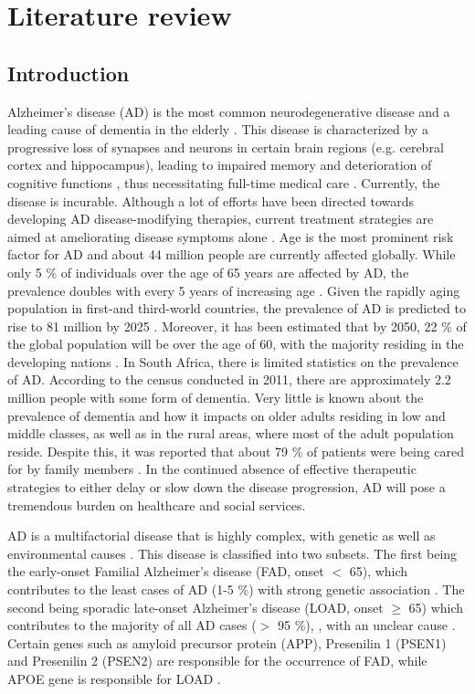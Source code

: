 \chapter{Literature review}
\section{Introduction}
Alzheimer’s disease (AD) is the most common neurodegenerative disease and a leading cause of dementia in the elderly \citep{andrieu2015}. This disease is characterized by a progressive loss of synapses and neurons in certain brain regions (e.g. cerebral cortex and hippocampus), leading to impaired memory and deterioration of cognitive functions \citep{dekosky1990,scheff2006,zare-shahabadi2015}, thus necessitating full-time medical care \citep{prince2013}. Currently, the disease is incurable. Although a lot of efforts have been directed towards developing AD disease-modifying therapies, current treatment strategies are aimed at ameliorating disease symptoms alone \citep{anand2014,disanto2013}. Age is the most prominent risk factor for AD and about 44 million people are currently affected globally. While only 5 \% of individuals over the age of 65 years are affected by AD, the prevalence doubles with every 5 years of increasing age \citep{pimenova2018,qiu2009}. Given the rapidly aging population in first-and third-world countries, the prevalence of AD is predicted to rise to 81 million by 2025 \citep{AlzheimersAssociation2014,Ferri2005}. Moreover, it has been estimated that by 2050, 22 \% of the global population will be over the age of 60, with the majority residing in the developing nations \citep{Annear2015,Paddick2013}. In South Africa, there is limited statistics on the prevalence of AD. According to the census conducted in 2011, there are approximately 2.2 million people with some form of dementia. Very little is known about the prevalence of dementia and how it impacts on older adults residing in low and middle classes, as well as in the rural areas, where most of the adult population reside. Despite this, it was reported that about 79 \% of patients were being cared for by family members \citep{Kalula2010}. In the continued absence of effective therapeutic strategies to either delay or slow down the disease progression, AD will pose a tremendous burden on healthcare and social services. 

AD is a multifactorial disease that is highly complex, with genetic as well as environmental causes \citep{Dorszewska2016}. This disease is classified into two subsets. The first being the early-onset Familial Alzheimer’s disease (FAD, onset $<$ 65), which contributes to the least cases of AD (1-5 \%) with strong genetic association \citep{Musiek2015,Reitz2014,Swerdlow2007}. The second being sporadic late-onset Alzheimer’s disease (LOAD, onset $\geq$ 65) which contributes to the majority of all AD cases ($>$ 95 \%), \citep{Musiek2015,Reitz2014,Swerdlow2007}, with an unclear cause \citep{Dorszewska2016,pimenova2018}. Certain genes such as amyloid precursor protein (APP), Presenilin 1 (PSEN1) and Presenilin 2  (PSEN2) are responsible for the occurrence of FAD, while APOE gene is responsible for LOAD \citep{Dorszewska2016}.

